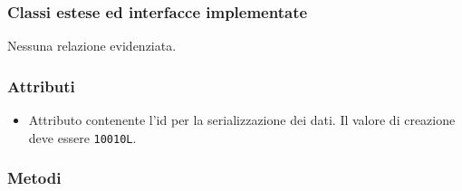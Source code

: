 \subsubsection*{Classi estese ed interfacce implementate}

Nessuna relazione evidenziata.

\subsubsection*{Attributi}

\begin{itemize}
	\item{}
	Attributo contenente l'id per la serializzazione dei dati. Il valore di creazione deve essere \texttt{10010L}.
\end{itemize}

\subsubsection*{Metodi}

